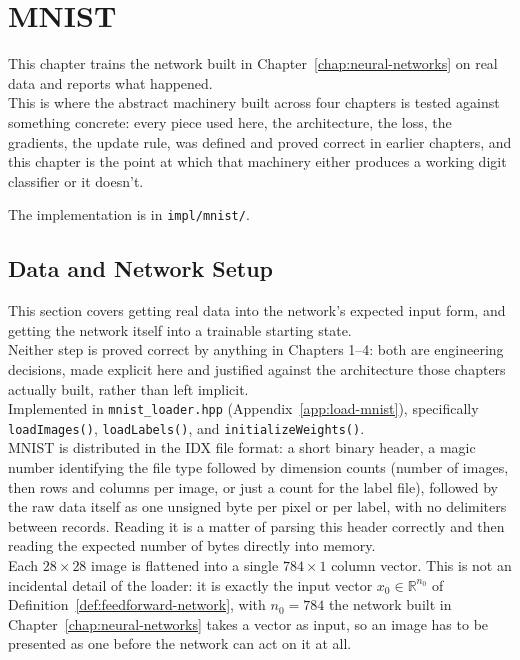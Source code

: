 \chapter{MNIST}
	
	This chapter trains the network built in Chapter~\ref{chap:neural-networks} on real data and reports what happened. \\
	
	This is where the abstract machinery built across four chapters is tested against something concrete: every piece used here, the architecture, the loss, the gradients, the update rule, was defined and proved correct in earlier chapters, and this chapter is the point at which that machinery either produces a working digit classifier or it doesn't.
	
	The implementation is in \texttt{impl/mnist/}.
	
\section{Data and Network Setup}
	
	This section covers getting real data into the network's expected input form, and getting the network itself into a trainable starting state. \\
	
	Neither step is proved correct by anything in Chapters 1--4: both are engineering decisions, made explicit here and justified against the architecture those chapters actually built, rather than left implicit. \\
	
	Implemented in \texttt{mnist\_loader.hpp} (Appendix~\ref{app:load-mnist}), specifically \texttt{loadImages()}, \texttt{loadLabels()}, and \texttt{initializeWeights()}. \\
	
	MNIST is distributed in the IDX file format: a short binary header, a magic number identifying the file type followed by dimension counts (number of images, then rows and columns per image, or just a count for the label file), followed by the raw data itself as one unsigned byte per pixel or per label, with no delimiters between records. Reading it is a matter of parsing this header correctly and then reading the expected number of bytes directly into memory. \\
	
	Each $28\times28$ image is flattened into a single $784\times1$ column vector. This is not an incidental detail of the loader: it is exactly the input vector $x_0\in\mathbb{R}^{n_0}$ of Definition~\ref{def:feedforward-network}, with $n_0=784$ the network built in Chapter~\ref{chap:neural-networks} takes a vector as input, so an image has to be presented as one before the network can act on it at all.
	

